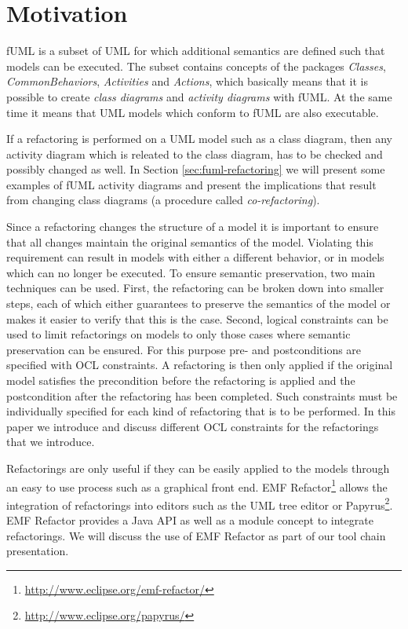 \documentclass{llncs}
\begin{document}
\section{Motivation}
\label{sec:motivation}
fUML is a subset of UML for which additional semantics are defined such that models can be executed. The subset contains concepts
of the packages \textit{Classes}, 
\textit{CommonBehaviors}, \textit{Activities} and \textit{Actions}, which basically means that it is possible to create 
\textit{class diagrams} and \textit{activity diagrams} with fUML. At the same time it means that UML models which conform to fUML
are also executable.

If a refactoring 
is performed on a UML model such as a class diagram, then any activity diagram which is releated to the class diagram, has 
to be checked and possibly changed as well. In Section \ref{sec:fuml-refactoring} we will present some examples of fUML 
activity diagrams and present the implications that result from changing class 
diagrams (a procedure called \textit{co-refactoring}).

Since a refactoring changes the structure of a model it is important to ensure that all changes maintain the original 
semantics of the model. Violating this requirement can result in models with either a different behavior, or in models 
which can no longer be executed. To ensure semantic preservation, two main techniques can be used. First, the refactoring 
can be broken down into smaller steps, each of which either guarantees to preserve the semantics of the model or makes it 
easier to verify that this is the case. Second, logical constraints can be used to limit refactorings on models to only 
those cases where semantic preservation can be ensured. For this purpose pre- and postconditions are specified with OCL 
constraints. A refactoring is then only applied if the original model satisfies the precondition before the refactoring is 
applied and the postcondition after the refactoring has been completed. Such constraints must be individually specified 
for each kind of refactoring that is to be performed. In this paper we introduce and discuss different OCL constraints 
for the refactorings that we introduce.

Refactorings are only useful if they can be easily applied to the models through an easy to use process such as a 
graphical front end. EMF Refactor\footnote{\url{http://www.eclipse.org/emf-refactor/}} allows the integration of 
refactorings into editors such as the UML tree editor or 
Papyrus\footnote{\url{http://www.eclipse.org/papyrus/}}. EMF Refactor provides a Java API as well as a module 
concept to integrate refactorings. We will discuss the use 
of EMF Refactor as part of our tool chain presentation.
\end{document}
